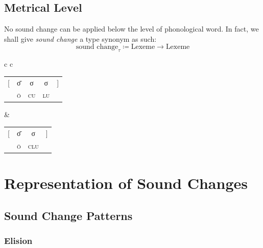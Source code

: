 \documentclass{report}[12pt]
\begin{document}
\subsection{Metrical Level}

No sound change can be applied below the level of phonological word. In fact, we shall give \emph{sound change} a type synonym as such:
\[ \text{sound change}_τ \coloneq \text{Lexeme} \rightarrow \text{Lexeme} \]

\begin{center}
  \begin{tabular}{c c}
    \begin{tabular}{c c c c c}
      [ & \={σ} & σ & σ & ] \\
        & \textsc{\={o}} & \textsc{cu} & \textsc{lu} & \\
    \end{tabular} \quad \Rightarrow &
    \begin{tabular}{c c c c}
      [ & \={σ} & σ & ] \\
        & \textsc{\={o}} & \textsc{clu} \\
    \end{tabular}
  \end{tabular}
\end{center}

\section{Representation of Sound Changes}

\subsection{Sound Change Patterns}

\subsubsection{Elision}\label{sec:elision_lam}
\end{document}
